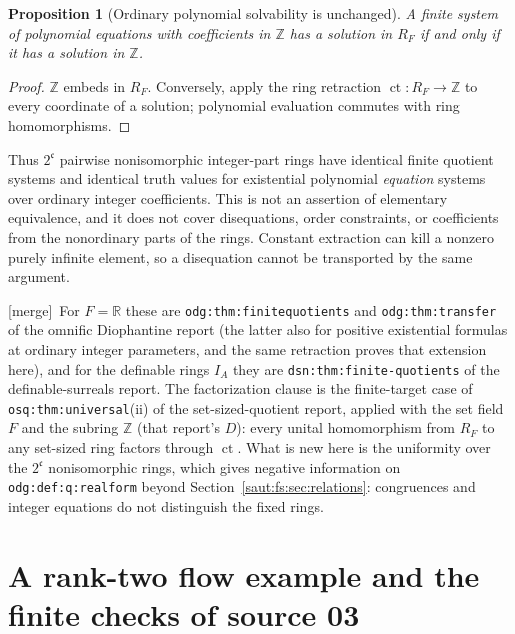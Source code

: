 \documentclass[11pt]{article}
\newtheorem{proposition}[theorem]{Proposition}
\theoremstyle{definition}
\theoremstyle{remark}
\newcommand{\R}{\mathbb R}
\newcommand{\Z}{\mathbb Z}
\newcommand{\lbl}[1]{\nolinkurl{#1}}%
\newcommand{\ct}{\operatorname{ct}}
\newcommand{\cc}{\mathfrak c}
\newcommand{\mergetag}{\textup{[merge]}}
\numberwithin{equation}{section}
\begin{document}
\begin{proposition}[Ordinary polynomial solvability is unchanged]\label{saut:gr:prop:dio}
A finite system of polynomial equations with coefficients in $\Z$ has a solution in
$R_F$ if and only if it has a solution in $\Z$.
\end{proposition}
\begin{proof}
$\Z$ embeds in $R_F$. Conversely, apply the ring retraction $\ct:R_F\to\Z$ to every
coordinate of a solution; polynomial evaluation commutes with ring homomorphisms.
\end{proof}

Thus $2^{\cc}$ pairwise nonisomorphic integer-part rings have identical finite quotient
systems and identical truth values for existential polynomial \emph{equation} systems
over ordinary integer coefficients. This is not an assertion of elementary equivalence,
and it does not cover disequations, order constraints, or coefficients from the
nonordinary parts of the rings. Constant extraction can kill a nonzero purely infinite
element, so a disequation cannot be transported by the same argument.

\mergetag\ For $F=\R$ these are \lbl{odg:thm:finitequotients} and \lbl{odg:thm:transfer}
of the omnific Diophantine report (the latter also for positive existential
formulas at ordinary integer parameters, and the same retraction proves that extension
here), and for the definable rings $I_A$ they are \lbl{dsn:thm:finite-quotients} of the definable-surreals report. The
factorization clause is the finite-target case of \lbl{osq:thm:universal}(ii) of the
set-sized-quotient report, applied with the set field $F$
and the subring $\Z$ (that report's $D$): every unital homomorphism from $R_F$ to any set-sized ring factors through
$\ct$. What is new here is the uniformity over the $2^{\cc}$ nonisomorphic rings, which
gives negative information on \lbl{odg:def:q:realform} beyond
Section~\ref{saut:fs:sec:relations}: congruences and integer equations do not
distinguish the fixed rings.

\section{A rank-two flow example and the finite checks of source 03}\label{saut:gr:sec:example}
\end{document}
